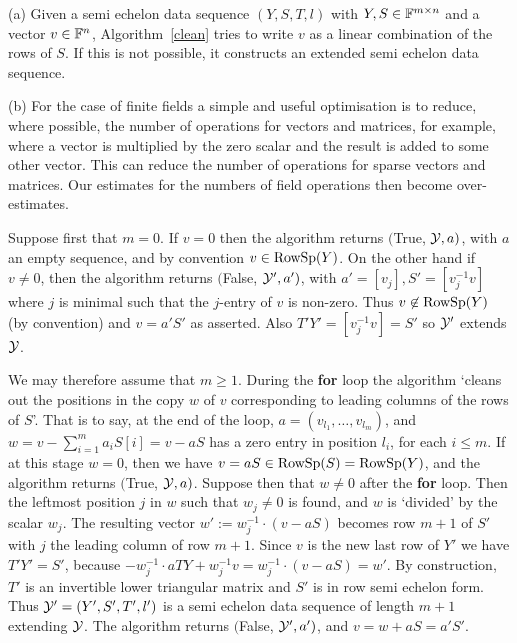 \begin{Rem}\label{rem:cae}
(a) Given a semi echelon data sequence $(Y,S,T,l)$ with $Y,S \in \mathbb{F}^{m
\times n}$ and a vector $v \in \mathbb{F}^n$, Algorithm~\ref{clean} tries to
write $v$ as a linear combination of the rows of $S$. If this is not
possible, it constructs an extended semi echelon data sequence.

\medskip\noindent
(b) For the case of finite fields a simple and useful
optimisation is to reduce, where possible, the number of operations for vectors and matrices, 
for example, where a vector is multiplied by the zero scalar and the
result is added to some other vector. This can reduce the number of operations for
sparse vectors and matrices. Our estimates for the numbers of field operations then become
over-estimates.
\end{Rem}

\smallskip
{}
Suppose first that $m=0$. If $v=0$ then the algorithm returns  $(${\sc True}, $\mathcal{Y},a)$, 
with $a$ an empty sequence, and by convention $v\in \mathrm{RowSp}(Y)$. On the other hand if 
$v\ne 0$, then the algorithm returns  $(${\sc False}, $\mathcal{Y}',a')$, with $a'=[v_j], S'=[v_j^{-1}v]$ 
where $j$ is minimal such that the $j$-entry of $v$ is non-zero. Thus $v\not\in\mathrm{RowSp}(Y)$ (by convention)
and $v=a'S'$ as asserted. Also $T'Y'=[v_j^{-1} v]=S'$ so $\mathcal{Y}'$ extends $\mathcal{Y}$. 

\medskip
We may therefore assume that $m\geq1$. During the \textbf{for} loop the algorithm `cleans out the positions in the copy
$w$ of $v$ corresponding to leading columns of the rows of $S$'. That is to say, at the end of the loop,
$a=(v_{l_1},\dots,v_{l_m})$, and $w=v-\sum_{i=1}^m a_i S[i] =v-aS$ has a zero entry in position $l_i$,
for each $i\leq m$. 
If at this stage $w=0$, then we have $v=aS\in\mathrm{RowSp}(S)=\mathrm{RowSp}(Y)$, and the algorithm returns $(${\sc True}, $\mathcal{Y},a)$. Suppose then that 
$w\ne0$ after the \textbf{for} loop. Then the leftmost position
$j$ in $w$ such that $w_j\ne0$ is found, and $w$ is `divided' by the scalar $w_j$. 
The resulting vector $w' := w_j^{-1} \cdot(v - aS)$ becomes  
row $m+1$ of $S'$ with $j$ the leading column of row $m+1$. Since $v$ is the
new last row of $Y'$ we have $T'Y' = S'$, because 
$-w_j^{-1} \cdot aTY + w_j^{-1} v = w_j^{-1} \cdot (v-aS) = w'$.
By construction, $T'$ is an invertible lower triangular matrix and
$S'$ is in row semi echelon form. Thus $\mathcal{Y}'=(Y',S',T',l')$ is a
semi echelon data sequence of length $m+1$ extending $\mathcal{Y}$. 
The algorithm returns  $(${\sc False}, $\mathcal{Y}',a')$, and $v=w+aS= a'S'$.

